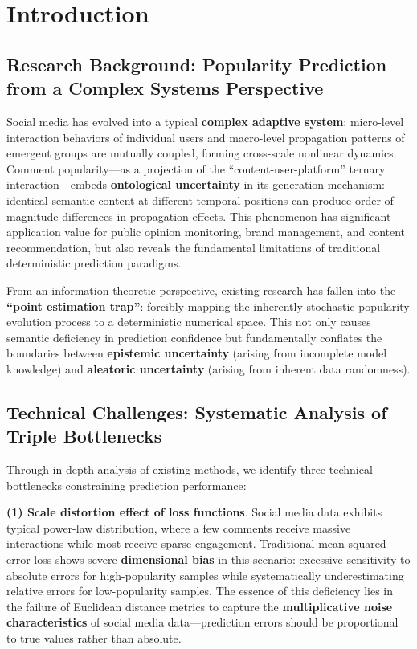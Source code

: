 \documentclass[10pt]{article}
\begin{document}
\section{Introduction}

\subsection{Research Background: Popularity Prediction from a Complex Systems Perspective}

Social media has evolved into a typical \textbf{complex adaptive system}: micro-level interaction behaviors of individual users and macro-level propagation patterns of emergent groups are mutually coupled, forming cross-scale nonlinear dynamics\cite{liu2019sentiment}. Comment popularity---as a projection of the ``content-user-platform'' ternary interaction---embeds \textbf{ontological uncertainty} in its generation mechanism: identical semantic content at different temporal positions can produce order-of-magnitude differences in propagation effects. This phenomenon has significant application value for public opinion monitoring\cite{zhang2020brand}, brand management, and content recommendation\cite{wu2019npa}, but also reveals the fundamental limitations of traditional deterministic prediction paradigms.

From an information-theoretic perspective, existing research has fallen into the \textbf{``point estimation trap''}: forcibly mapping the inherently stochastic popularity evolution process to a deterministic numerical space. This not only causes semantic deficiency in prediction confidence but fundamentally conflates the boundaries between \textbf{epistemic uncertainty} (arising from incomplete model knowledge) and \textbf{aleatoric uncertainty} (arising from inherent data randomness).

\subsection{Technical Challenges: Systematic Analysis of Triple Bottlenecks}

Through in-depth analysis of existing methods, we identify three technical bottlenecks constraining prediction performance:

\textbf{(1) Scale distortion effect of loss functions}. Social media data exhibits typical power-law distribution, where a few comments receive massive interactions while most receive sparse engagement. Traditional mean squared error loss shows severe \textbf{dimensional bias} in this scenario: excessive sensitivity to absolute errors for high-popularity samples while systematically underestimating relative errors for low-popularity samples. The essence of this deficiency lies in the failure of Euclidean distance metrics to capture the \textbf{multiplicative noise characteristics} of social media data---prediction errors should be proportional to true values rather than absolute.
\end{document}
